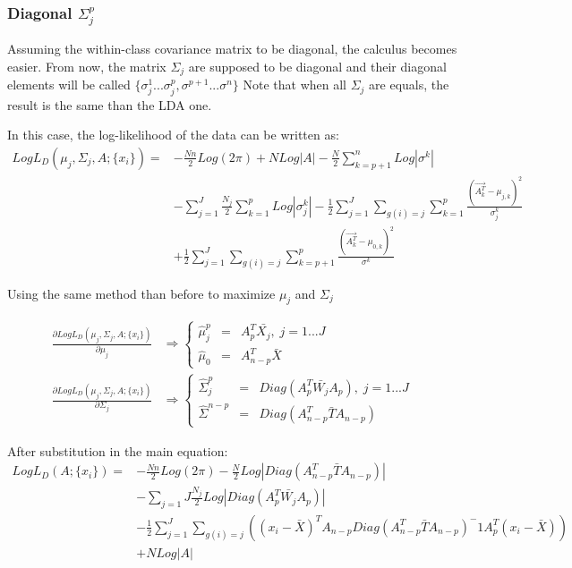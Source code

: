 \subsubsection{Diagonal $\Sigma_j^p$}
Assuming the within-class covariance matrix to be diagonal, the calculus becomes easier.
From now, the matrix $\Sigma_j$ are supposed to be diagonal and their diagonal elements will be called $\{\sigma_j^1...\sigma_j^p,
\sigma^{p + 1}...\sigma^n\}$
Note that when all $\Sigma_j$ are equals, the result is the same than the LDA one.

In this case, the log-likelihood of the data can be written as:
$$
\begin{array}{cl}
  Log L_D(\mu_j, \Sigma_j, A; \{x_i\}) = & -\frac{N n}{2} Log (2\pi) + N Log|A| - \frac{N}{2}\sum\limits_{k = p + 1}^n Log|\sigma^k| \\
  & - \sum\limits_{j = 1}^J \frac{N_j}{2} \sum\limits_{k = 1}^p Log|\sigma_j^k| - \frac{1}{2}\sum\limits_{j = 1}^J\sum\limits_{g(i) = j}
  \sum\limits_{k = 1}^p \frac{(\vec{A_k^T} - \mu_{j,k})^2}{\sigma_j^k} \\
  & + \frac{1}{2}\sum\limits_{j = 1}^J\sum\limits_{g(i) = j}
  \sum\limits_{k = p + 1}^p \frac{(\vec{A_k^T} - \mu_{0,k})^2}{\sigma^k}
\end{array}
$$

Using the same method than before to maximize $\mu_j$ and $\Sigma_j$

$$
\begin{array}{cc}
  \frac{\partial Log L_D(\mu_j, \Sigma_j, A; \{x_i\})}{\partial \mu_j} & \Rightarrow \left \{
  \begin{array}{ccc}
    \hat\mu_j^p & = & A_p^T\bar{X_j} ,\; j = 1...J\\
    \hat\mu_0 & = & A_{n - p}^T\bar{X}
  \end{array}
  \right . \\
  \frac{\partial Log L_D(\mu_j, \Sigma_j, A; \{x_i\})}{\partial \Sigma_j} & \Rightarrow \left \{
  \begin{array}{ccc}
    \hat\Sigma_j^p & = & Diag(A_p^T\bar{W_j}A_p), \; j = 1...J\\
    \hat\Sigma^{n - p} & = & Diag(A_{n - p}^T\bar{T}A_{n - p})
  \end{array}
  \right .
\end{array}
$$

After substitution in the main equation:
$$
\begin{array}{cl}
  Log L_D(A; \{x_i\}) = & - \frac{N n}{2} Log(2\pi) - \frac{N}{2} Log|Diag(A_{n - p}^T\bar{T}A_{n - p})| \\
  & - \sum\limits_{j = 1}{J}\frac{N_j}{2} Log|Diag(A_p^T\bar{W_j}A_p)| \\
  & - \frac{1}{2} \sum\limits_{j = 1}^J \sum\limits_{g(i) = j} ((x_i - \bar{X} )^T A_{n - p} Diag( A_{n - p}^T \bar{T} A_{n - p} )^-1 A_p^T(x_i - \bar{X}))\\
  & + N Log |A|
\end{array}
$$

